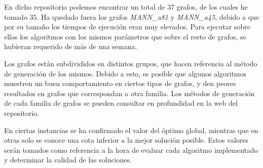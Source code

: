 En dicho repositorio podemos encontrar un total de $37$ grafos, de los cuales he tomado $35$.
Ha quedado fuera los grafos \textit{MANN\_a81} y \textit{MANN_a45}, debido a que por su tamaño
los tiempos de ejecución eran muy elevados. Para ejecutar sobre ellos los algoritmos con los
mismos parámetros que sobre el resto de grafos, se hubieran requerido de más de una semana. 

Los grafos están subdivididos en distintos grupos, que hacen referencia al método de
generación de los mismos. Debido a esto, es posible que algunos algoritmos muestren
un buen comportamiento en ciertos tipos de grafos, y den peores resultados en grafos
que correspondan a otra familia. Los métodos de generación de cada familia de grafos
se pueden consultar en profundidad en la web del repositorio.

En ciertas instancias se ha confirmado el valor del óptimo global, mientras que en
otras solo se conoce una cota inferior a la mejor solución posible. Estos valores
serán tomados como referencia a la hora de evaluar cada algoritmo implementado y
determinar la calidad de las soluciones.
